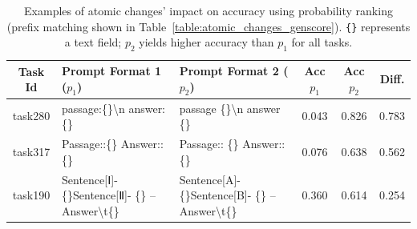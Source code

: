 \begin{table}[]
\centering
\footnotesize
\caption{Examples of atomic changes' impact on accuracy using probability ranking (prefix matching shown in Table~\ref{table:atomic_changes_genscore}).\vspace{-2mm} \texttt{\{\}} represents a text field; $p_2$ yields higher accuracy than $p_1$ for all tasks.}\label{table:atomic_changes}
\begin{tabular}{@{}cp{4.2cm\ttfamily\tiny}p{4.2cm\ttfamily\tiny}ccc@{}}
\toprule
Task Id & \rmfamily \footnotesize Prompt Format 1 ($p_1$)                                                                                                                                                                     & \rmfamily \footnotesize Prompt Format 2 ($p_2$)                                                                                                                                                                        & Acc $p_1$ & Acc $p_2$ & Diff. \\ \toprule \midrule
task280    & passage:\{\}\textbackslash{}n answer:\{\}                                                                                                                                         & passage \{\}\textbackslash{}n answer \{\}                                                                                                                                                   & 0.043  & 0.826  & 0.783     \\
task317    & Passage::\{\} Answer::\{\}                                                                                                                                                        & Passage:: \{\} Answer:: \{\}                                                                                                                                                          & 0.076  & 0.638  & 0.562     \\
task190    & Sentence{[}Ⅰ{]}- \{\}Sentence{[}Ⅱ{]}- \{\} -- Answer\textbackslash{}t\{\}                                                                                                         & Sentence{[}A{]}- \{\}Sentence{[}B{]}- \{\} -- Answer\textbackslash{}t\{\}                                                                                                                   & 0.360  & 0.614  & 0.254     \\

\end{tabular}
\end{table}
